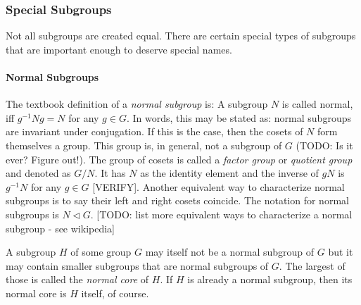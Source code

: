 


\subsubsection{Special Subgroups}
Not all subgroups are created equal. There are certain special types of subgroups that are important enough to deserve special names.

\paragraph{Normal Subgroups} The textbook definition of a \emph{normal subgroup} is:  A subgroup $N$ is called normal, iff $g^{-1} N g = N$ for any $g \in G$. In words, this may be stated as: normal subgroups are invariant under conjugation. If this is the case, then the cosets of $N$ form themselves a group. This group is, in general, not a subgroup of $G$ (TODO: Is it ever? Figure out!). The group of cosets is called a \emph{factor group} or \emph{quotient group} and denoted as $G / N$. It has $N$ as the identity element and the inverse of $g N$ is $g^{-1} N$ for any $g \in G$ [VERIFY]. Another equivalent way to characterize normal subgroups is to say their left and right cosets coincide. The notation for normal subgroups is $N \triangleleft G$. [TODO: list more equivalent ways to characterize a normal subgroup - see wikipedia]

\medskip
A subgroup $H$ of some group $G$ may itself not be a normal subgroup of $G$ but it may contain smaller subgroups that are normal subgroups of $G$. The largest of those is called the \emph{normal core} of $H$. If $H$ is already a normal subgroup, then its normal core is $H$ itself, of course.




